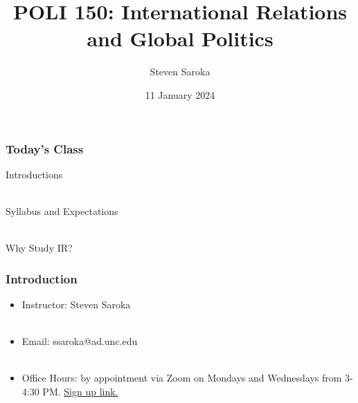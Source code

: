 \documentclass{beamer}
\title[Introduction]{\LARGE{POLI 150: International Relations and Global Politics}}
\author[POLI 150]{Steven Saroka}
\institute{POLI 150}
\date{11 January 2024}
\begin{document}
\begin{frame}
\titlepage %
\end{frame}






\begin{frame} 
	\frametitle{\LARGE{Today's Class}}
	\begin{itemize}
		\Large{
			\item Introductions
			\\~\\ 
			\item Syllabus and Expectations
			\\~\\
			\item Why Study IR? 
			}
	\end{itemize}
\end{frame}

\begin{frame} 
	\frametitle{\LARGE{Introduction}}
	\begin{itemize}
		\item Instructor: Steven Saroka
		\\~\\
		\item Email: ssaroka@ad.unc.edu
		\\~\\
		\item Office Hours: by appointment via Zoom on Mondays and Wednesdays from 3-4:30 PM. \href{https://www.signupgenius.com/go/10C0F48AFAD29A6FDCF8-47020746-poli\#/}{Sign up link.}
	\end{itemize}
\end{frame}
\end{document}
